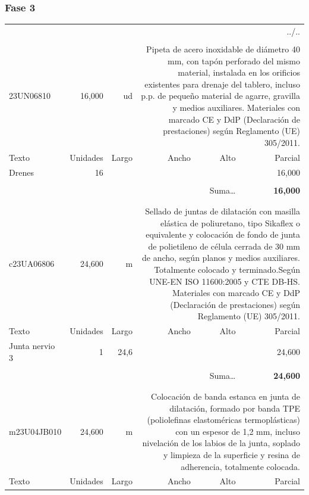 \documentclass{book}%
\begin{document}
%
\subsubsection{Fase 3}%
\begin{longtable}{lrrrrr}%
\multicolumn{6}{r}{../..}\\%
\endfoot%
\endlastfoot%
&&&&&\\%
23UN06810&    16,000& ud&\multicolumn{3}{p{6cm}}{\scriptsize Pipeta de acero inoxidable de diámetro 40 mm, con tapón perforado del mismo material, instalada en los orificios existentes para drenaje del tablero, incluso p.p. de pequeño material de agarre, gravilla y medios auxiliares. Materiales con marcado CE y DdP (Declaración de prestaciones) según Reglamento (UE) 305/2011.\normalsize}\\%
Texto&Unidades&Largo&Ancho&Alto&Parcial\\%
\hline%
\multicolumn{1}{p{3.5cm}}{Drenes}&16&&&&    16,000\\%
&&&&&\\%
\multicolumn{5}{r}{Suma\ldots}&\textbf{    16,000}\\%
\hline%
&&&&&\\%
&&&&&\\%
c23UA06806&    24,600& m&\multicolumn{3}{p{6cm}}{\scriptsize Sellado de juntas de dilatación con masilla elástica de poliuretano, tipo Sikaflex o equivalente y colocación de fondo de junta de polietileno de célula cerrada de 30 mm de ancho, según planos y medios auxiliares. Totalmente colocado y terminado.Según UNE-EN ISO 11600:2005 y CTE DB-HS. Materiales con marcado CE y DdP (Declaración de prestaciones) según Reglamento (UE) 305/2011.\normalsize}\\%
Texto&Unidades&Largo&Ancho&Alto&Parcial\\%
\hline%
\multicolumn{1}{p{3.5cm}}{Junta nervio 3}&1&24,6&&&    24,600\\%
&&&&&\\%
\multicolumn{5}{r}{Suma\ldots}&\textbf{    24,600}\\%
\hline%
&&&&&\\%
&&&&&\\%
m23U04JB010&    24,600& m&\multicolumn{3}{p{6cm}}{\scriptsize Colocación de banda estanca en junta de dilatación, formado por banda TPE (poliolefinas elastoméricas termoplásticas) con un espesor de 1,2 mm, incluso nivelación de los labios de la junta, soplado y limpieza de la superficie y resina de adherencia, totalmente colocada.\normalsize}\\%
Texto&Unidades&Largo&Ancho&Alto&Parcial\\%

\end{longtable}
\end{document}
